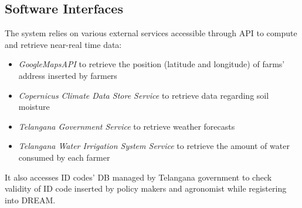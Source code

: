 \subsection{Software Interfaces}

The system relies on various external services accessible through API to compute and retrieve near-real time data:
\begin{itemize}
    \item \textit{GoogleMapsAPI} to retrieve the position (latitude and longitude) of farms' address inserted by farmers
    \item \textit{Copernicus Climate Data Store Service} to retrieve data regarding soil moisture
    \item \textit{Telangana Government Service} to retrieve weather forecasts
    \item \textit{Telangana Water Irrigation System Service} to retrieve the amount of water consumed by each farmer
\end{itemize}
It also accesses ID codes’ DB managed by Telangana government to check validity of ID code inserted by policy makers and agronomist while registering into DREAM.

